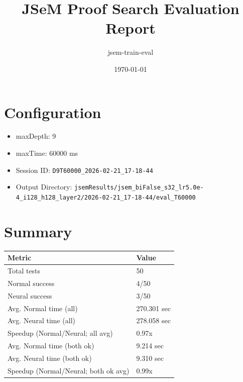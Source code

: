 \documentclass[a4paper,10pt]{article}
\title{JSeM Proof Search Evaluation Report}
\author{jsem-train-eval}
\date{\today}
\begin{document}
\maketitle

\section{Configuration}
\begin{itemize}
\item maxDepth: 9
\item maxTime: 60000 ms
\item Session ID: \texttt{D9T60000\_2026-02-21\_17-18-44}
\item Output Directory: \texttt{jsemResults/jsem\_biFalse\_s32\_lr5.0e-4\_i128\_h128\_layer2/2026-02-21\_17-18-44/eval\_T60000}
\end{itemize}

\section{Summary}
\begin{tabular}{ll}
\toprule
\textbf{Metric} & \textbf{Value} \\
\midrule
Total tests & 50 \\
Normal success & 4/50 \\
Neural success & 3/50 \\
\midrule
Avg. Normal time (all) & 270.301 sec \\
Avg. Neural time (all) & 278.058 sec \\
Speedup (Normal/Neural; all avg) & 0.97x \\
Avg. Normal time (both ok) & 9.214 sec \\
Avg. Neural time (both ok) & 9.310 sec \\
Speedup (Normal/Neural; both ok avg) & 0.99x \\
\bottomrule
\end{tabular}
\end{document}
